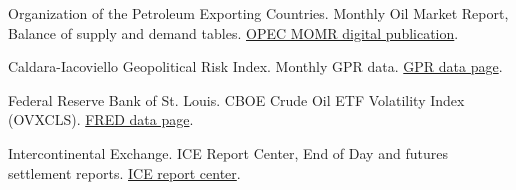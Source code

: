 {\begin{enumerate}[label={[\arabic*]},leftmargin=2.2em,itemsep=0.42em,topsep=0.25em]
\item
Organization of the Petroleum Exporting Countries. Monthly Oil Market Report, Balance of supply and demand tables. \href{https://publications.opec.org/momr/chapter/147/2738}{OPEC MOMR digital publication}.

\item
Caldara-Iacoviello Geopolitical Risk Index. Monthly GPR data. \href{https://www.matteoiacoviello.com/gpr.htm}{GPR data page}.

\item
Federal Reserve Bank of St. Louis. CBOE Crude Oil ETF Volatility Index (OVXCLS). \href{https://fred.stlouisfed.org/series/OVXCLS}{FRED data page}.

\item
Intercontinental Exchange. ICE Report Center, End of Day and futures settlement reports. \href{https://www.ice.com/report/83}{ICE report center}.

\end{enumerate}
}
